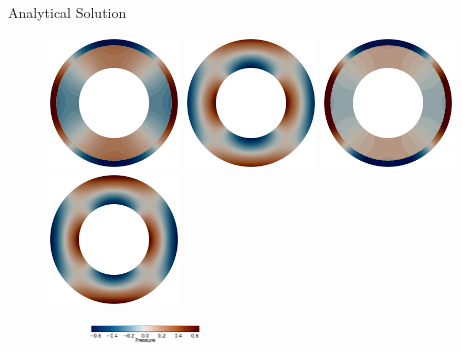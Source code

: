 \documentclass[10pt,aspectratio=169]{beamer}
\begin{document}
\begin{frame}{Analytical Solution}
	\begin{figure}[!htb]
		\vspace{-0.5in}
		\begin{multicols}{4}
			\includegraphics[width=3.5cm]{./case1/p_ana.png}\par
			\hspace{0.75in}
			\includegraphics[width=3.5cm]{./case2/p_ana.png}\par
			\hspace{1.5in}
			\includegraphics[width=3.5cm]{./case3/p_ana.png}\par
			\hspace{2.25in}
			\includegraphics[width=3.5cm]{./case4/p_ana.png}
		\end{multicols}
		\vspace{-0.27in}
		\begin{figure}
			\hspace{0.1in} 
			\includegraphics[width=3cm]{./case1/p_ana_cbhorz.pdf}
		\end{figure}
	\end{figure}
\end{frame}
\end{document}
